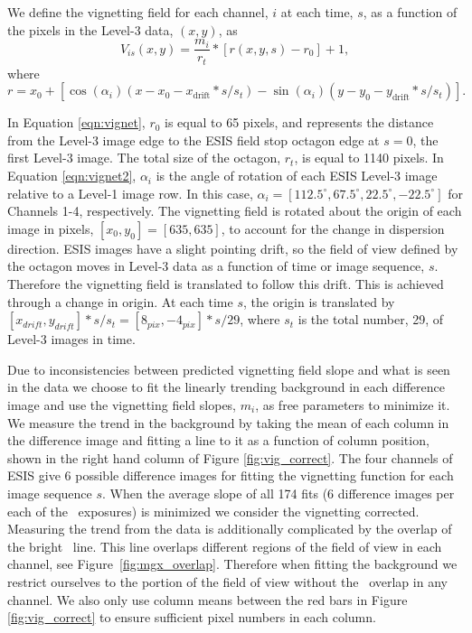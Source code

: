         We define the vignetting field for each channel, $i$ at each time, $s$, as a function of the pixels in the Level-3 data, $(x,y)$, as 
        	\begin{equation}
        		V_{is}(x,y) = \frac{m_i}{r_t} * [r(x,y,s) - r_0] + 1,
        		\label{eqn:vignet}
        	\end{equation}
		where
			\begin{equation}
				r = x_0 + [\cos(\alpha_i)(x-x_0-x_{\text{drift}}*s/s_t) - \sin(\alpha_i)(y-y_0-y_{\text{drift}}*s/s_t)].
				\label{eqn:vignet2}
			\end{equation}
        
        In Equation \ref{eqn:vignet}, $r_0$ is equal to 65 pixels, and represents the distance from the Level-3 image edge to the ESIS field stop octagon edge at $s = 0$, the first Level-3 image.
        The total size of the octagon, $r_t$, is equal to 1140 pixels.
        In Equation \ref{eqn:vignet2},  $\alpha_i$ is the angle of rotation of each ESIS Level-3 image relative to a Level-1 image row.
        In this case, $\alpha_i = [112.5^{\circ}, 67.5^{\circ}, 22.5^{\circ}, -22.5^{\circ}]$ for Channels 1-4, respectively.
        The vignetting field is rotated about the origin of each image in pixels, $[x_0, y_0] = [635,635]$, to account for the change in dispersion direction.
        ESIS images have a slight pointing drift, so the field of view defined by the octagon moves in Level-3 data as a function of time or image sequence, $s$.
        Therefore the vignetting field is translated to follow this drift.
        This is achieved through a change in origin.
        At each time $s$, the origin is translated by $[x_{drift},y_{drift}]*s/s_t = [8_{pix},-4_{pix}]*s/29$, where $s_t $ is the total number, 29, of Level-3 images in time. 
        
        Due to inconsistencies between predicted vignetting field slope and what is seen in the data we choose to fit the linearly trending background in each difference image and use the vignetting field slopes, $m_i$, as free parameters to minimize it.
        We measure the trend in the background by taking the mean of each column in the difference image and fitting a line to it as a function of column position, shown in the right hand column of Figure \ref{fig:vig_correct}.
        The four channels of ESIS give 6 possible difference images for fitting the vignetting function for each image sequence $s$. 
        When the average slope of all 174 fits (6 difference images per each of the \numDataFrames \ exposures) is minimized we consider the vignetting corrected.
        Measuring the trend from the data is additionally complicated by the overlap of the bright \mgxbright \ line.  
        This line overlaps different regions of the field of view in each channel, see Figure~\ref{fig:mgx_overlap}.  
        Therefore when fitting the background we restrict ourselves to the portion of the field of view without the \mgxbright \ overlap in any channel.
        We also only use column means between the red bars in Figure \ref{fig:vig_correct} to ensure sufficient pixel numbers in each column.  
        
